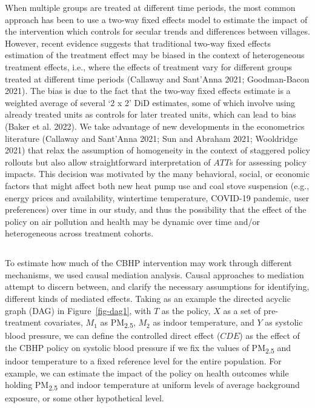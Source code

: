 \documentclass[
  letterpaper,
  DIV=11,
  numbers=noendperiod]{scrartcl}
\providecommand{\DIFaddtex}[1]{{\protect\color{blue}\uwave{#1}}} %
\providecommand{\DIFaddbegin}{} %
\providecommand{\DIFaddend}{} %
\providecommand{\DIFdelbegin}{} %
\providecommand{\DIFdelend}{} %
\providecommand{\DIFadd}[1]{\texorpdfstring{\DIFaddtex{#1}}{#1}} %
\newcommand{\DIFscaledelfig}{0.5}
\newlength{\DIFdelgraphicswidth} %
\newlength{\DIFdelgraphicsheight} %
\newcommand{\DIFaddincludegraphics}[2][]{{\color{blue}\fbox{\DIFOincludegraphics[#1]{#2}}}} %
\newcommand{\DIFdelincludegraphics}[2][]{%
\sbox{\DIFdelgraphicsbox}{\DIFOincludegraphics[#1]{#2}}%
\settoboxwidth{\DIFdelgraphicswidth}{\DIFdelgraphicsbox} %
\settoboxtotalheight{\DIFdelgraphicsheight}{\DIFdelgraphicsbox} %
\scalebox{\DIFscaledelfig}{%
\parbox[b]{\DIFdelgraphicswidth}{\usebox{\DIFdelgraphicsbox}\\[-\baselineskip] \rule{\DIFdelgraphicswidth}{0em}}\llap{\resizebox{\DIFdelgraphicswidth}{\DIFdelgraphicsheight}{%
\setlength{\unitlength}{\DIFdelgraphicswidth}%
\begin{picture}(1,1)%
\thicklines\linethickness{2pt} %
{\color[rgb]{1,0,0}\put(0,0){\framebox(1,1){}}}%
{\color[rgb]{1,0,0}\put(0,0){\line( 1,1){1}}}%
{\color[rgb]{1,0,0}\put(0,1){\line(1,-1){1}}}%
\end{picture}%
}\hspace*{3pt}}} %
} %
\DeclareRobustCommand{\DIFaddbegin}{\DIFOaddbegin \let\includegraphics\DIFaddincludegraphics} %
\DeclareRobustCommand{\DIFaddend}{\DIFOaddend \let\includegraphics\DIFOincludegraphics} %
\DeclareRobustCommand{\DIFdelbegin}{\DIFOdelbegin \let\includegraphics\DIFdelincludegraphics} %
\DeclareRobustCommand{\DIFdelend}{\DIFOaddend \let\includegraphics\DIFOincludegraphics} %
\begin{document}
When multiple groups are treated at different time periods, the most
common approach has been to use a two-way fixed effects model to
estimate the impact of the intervention which controls for secular
trends and differences between villages. However, recent evidence
suggests that traditional two-way fixed effects estimation of the
treatment effect may be biased in the context of heterogeneous treatment
effects, i.e., where the effects of treatment vary for different groups
treated at different time periods (Callaway and Sant'Anna 2021;
Goodman-Bacon 2021). The bias is due to the fact that the two-way fixed
effects estimate is a weighted average of several `2 x 2' DiD estimates,
some of which involve using already treated units as controls for later
treated units, which can lead to bias (Baker et al. 2022). We take
advantage of new developments in the econometrics literature (Callaway
and Sant'Anna 2021; Sun and Abraham 2021; Wooldridge 2021) that relax
the assumption of homogeneity in the context of staggered policy
rollouts but also allow straightforward interpretation of \(ATT\)s for
assessing policy impacts. This decision was motivated by the many
behavioral, social, or economic factors that might affect both new heat
pump use and coal stove suspension (e.g., energy prices and
availability, wintertime temperature, COVID-19 pandemic, user
preferences) over time in our study, and thus the possibility that the
effect of the policy on air pollution and health may be dynamic over
time and/or heterogeneous across treatment cohorts.

\DIFdelbegin %
\DIFdelend \DIFaddbegin \subsection{\DIFadd{Measuring pathways and
mechanisms}}\label{measuring-pathways-and-mechanisms}
\DIFaddend 

To estimate how much of the CBHP intervention may work through different
mechanisms, we used causal mediation analysis. Causal approaches to
mediation attempt to discern between, and clarify the necessary
assumptions for identifying, different kinds of mediated effects. Taking
as an example the directed acyclic graph (DAG) in Figure~\ref{fig-dag1},
with \(T\) as the policy, \(X\) as a set of pre-treatment covariates,
\(M_{1}\) as PM\textsubscript{2.5}, \(M_{2}\) as indoor temperature, and
\(Y\) as systolic blood pressure, we can define the controlled direct
effect (\(CDE\)) as the effect of the CBHP policy on systolic blood
pressure if we fix the values of PM\textsubscript{2.5} and indoor
temperature to a fixed reference level for the entire population. For
example, we can estimate the impact of the policy on health outcomes
while holding PM\textsubscript{2.5} and indoor temperature at uniform
levels of average background exposure, or some other hypothetical level.
\end{document}
